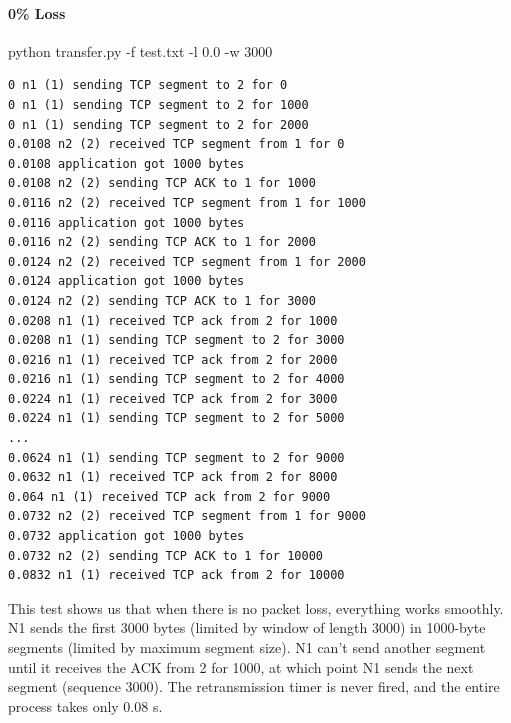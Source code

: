 \documentclass[11pt]{article}
\begin{document}
\paragraph{0\% Loss}
python transfer.py -f test.txt -l 0.0 -w 3000
\begin{lstlisting}
0 n1 (1) sending TCP segment to 2 for 0
0 n1 (1) sending TCP segment to 2 for 1000
0 n1 (1) sending TCP segment to 2 for 2000
0.0108 n2 (2) received TCP segment from 1 for 0
0.0108 application got 1000 bytes
0.0108 n2 (2) sending TCP ACK to 1 for 1000
0.0116 n2 (2) received TCP segment from 1 for 1000
0.0116 application got 1000 bytes
0.0116 n2 (2) sending TCP ACK to 1 for 2000
0.0124 n2 (2) received TCP segment from 1 for 2000
0.0124 application got 1000 bytes
0.0124 n2 (2) sending TCP ACK to 1 for 3000
0.0208 n1 (1) received TCP ack from 2 for 1000
0.0208 n1 (1) sending TCP segment to 2 for 3000
0.0216 n1 (1) received TCP ack from 2 for 2000
0.0216 n1 (1) sending TCP segment to 2 for 4000
0.0224 n1 (1) received TCP ack from 2 for 3000
0.0224 n1 (1) sending TCP segment to 2 for 5000
...
0.0624 n1 (1) sending TCP segment to 2 for 9000
0.0632 n1 (1) received TCP ack from 2 for 8000
0.064 n1 (1) received TCP ack from 2 for 9000
0.0732 n2 (2) received TCP segment from 1 for 9000
0.0732 application got 1000 bytes
0.0732 n2 (2) sending TCP ACK to 1 for 10000
0.0832 n1 (1) received TCP ack from 2 for 10000
\end{lstlisting}
This test shows us that when there is no packet loss, everything works smoothly. N1 sends the first 3000 bytes (limited by window of length 3000) in 1000-byte segments (limited by maximum segment size). N1 can't send another segment until it receives the ACK from 2 for 1000, at which point N1 sends the next segment (sequence 3000). The retransmission timer is never fired, and the entire process takes only 0.08 s.
\end{document}

